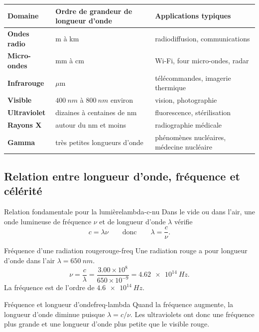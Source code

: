 \documentclass[11pt,a4paper]{article}
\begin{document}
\begin{table}[h]
\centering
\begin{tabularx}{\textwidth}{>{\bfseries}lXX}
\toprule
Domaine & Ordre de grandeur de longueur d'onde & Applications typiques\\
\midrule
Ondes radio & m à km & radiodiffusion, communications\\
Micro-ondes & mm à cm & Wi-Fi, four micro-ondes, radar\\
Infrarouge & $\mu$m & télécommandes, imagerie thermique\\
Visible & $\SI{400}{nm}$ à $\SI{800}{nm}$ environ & vision, photographie\\
Ultraviolet & dizaines à centaines de nm & fluorescence, stérilisation\\
Rayons X & autour du nm et moins & radiographie médicale\\
Gamma & très petites longueurs d'onde & phénomènes nucléaires, médecine nucléaire\\
\bottomrule
\end{tabularx}
\end{table}

\subsection{Relation entre longueur d'onde, fréquence et célérité}

\begin{theorembox}{Relation fondamentale pour la lumière}{lambda-c-nu}
Dans le vide ou dans l'air, une onde lumineuse de fréquence $\nu$ et de longueur d'onde $\lambda$ vérifie
\[
\boxed{c=\lambda\nu} \qquad \text{donc} \qquad \boxed{\lambda=\frac{c}{\nu}}.
\]
\end{theorembox}

\begin{examplebox}{Fréquence d'une radiation rouge}{rouge-freq}
Une radiation rouge a pour longueur d'onde dans l'air $\lambda=\SI{650}{nm}$.
\[
\nu=\frac{c}{\lambda}=\frac{3.00\times 10^8}{650\times 10^{-9}}=\SI{4.62e14}{Hz}.
\]
La fréquence est de l'ordre de $\SI{4.6e14}{Hz}$.
\end{examplebox}

\begin{warningbox}{Fréquence et longueur d'onde}{freq-lambda}
Quand la fréquence augmente, la longueur d'onde diminue puisque $\lambda=c/\nu$. Les ultraviolets ont donc une fréquence plus grande et une longueur d'onde plus petite que le visible rouge.
\end{warningbox}
\end{document}
